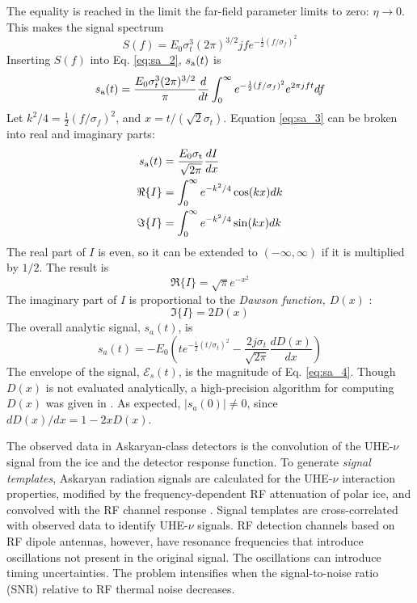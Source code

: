 \documentclass[amsmath,amssymb,aps,prd,10pt,twocolumn,showkeys]{revtex4}
\begin{document}
The equality is reached in the limit the far-field parameter limits to zero: $\eta \to 0$.  This makes the signal spectrum
\begin{equation}
S(f) = E_0 \sigma_t^3 (2\pi)^{3/2} j f e^{-\frac{1}{2}\left(f/\sigma_f\right)^2} \label{eq:spec}
\end{equation}
Inserting $S(f)$ into Eq. \ref{eq:sa_2}, $s_{\rm a}(t)$ is
\begin{equation}
s_{\rm a}(t) = \frac{E_0 \sigma_t^3 (2\pi)^{3/2}}{\pi} \frac{d}{dt}\int_0^{\infty} e^{-\frac{1}{2}\left(f/\sigma_f\right)^2} e^{2\pi j f t} df \label{eq:sa_3}
\end{equation}
 Let $k^2/4 = \frac{1}{2}\left(f/\sigma_f\right)^2$, and $x = t/(\sqrt{2}\sigma_t)$.  Equation \ref{eq:sa_3} can be broken into real and imaginary parts:
\begin{align}
s_{\rm a}(t) &= \frac{E_0 \sigma_{\rm t}}{\sqrt{2\pi}}\frac{dI}{dx} \\
\Re\lbrace I \rbrace &= \int_0^{\infty} e^{-k^2/4}\cos(kx) dk \\
\Im\lbrace I \rbrace &= \int_0^{\infty} e^{-k^2/4}\sin(kx) dk
\end{align}
The real part of $I$ is even, so it can be extended to $(-\infty,\infty)$ if it is multiplied by $1/2$.  The result is
\begin{equation}
\Re\lbrace I \rbrace = \sqrt{\pi} e^{-x^2}
\end{equation}
The imaginary part of $I$ is proportional to the \textit{Dawson function, $D(x)$} \cite{NIST:DLMF}:
\begin{equation}
\Im\lbrace I\rbrace = 2 D(x)
\end{equation}
 The overall analytic signal, $s_a(t)$, is
\begin{equation}
s_a(t) = -E_0 \left(t e^{-\frac{1}{2}\left(t/\sigma_t\right)^2} - \frac{2 j\sigma_t}{\sqrt{2\pi}} \frac{dD(x)}{dx}\right) \label{eq:sa_4}
\end{equation}
The envelope of the signal, $\mathcal{E}_s(t)$, is the magnitude of Eq. \ref{eq:sa_4}.  Though $D(x)$ is not evaluated analytically, a high-precision algorithm for computing $D(x)$ was given in \cite{10.1063/1.4822832}.  As expected, $|s_a(0)| \neq 0$, since $dD(x)/dx = 1 - 2x D(x)$.

The observed data in Askaryan-class detectors is the convolution of the UHE-$\nu$ signal from the ice and the detector response function.  To generate \textit{signal templates}, Askaryan radiation signals are calculated for the UHE-$\nu$ interaction properties, modified by the frequency-dependent RF attenuation of polar ice, and convolved with the RF channel response \cite{10.1016/j.astropartphys.2014.09.002,10.3189/2015jog14j214}.  Signal templates are cross-correlated with observed data to identify UHE-$\nu$ signals.  RF detection channels based on RF dipole antennas, however, have resonance frequencies that introduce oscillations not present in the original signal.  The oscillations can introduce timing uncertainties.  The problem intensifies when the signal-to-noise ratio (SNR) relative to RF thermal noise decreases.
\end{document}
